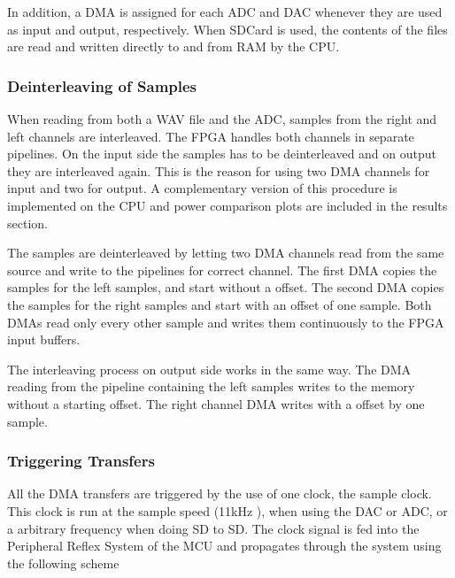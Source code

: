 In addition, a DMA is assigned for each ADC and DAC whenever
they are used as input and output, respectively. When SDCard is
used, the contents of the files are read and written directly to
and from RAM by the CPU.

\subsubsection{Deinterleaving of Samples}

When reading from both a WAV file and the ADC, samples from
the right and left channels are interleaved. The FPGA handles
both channels in separate pipelines. On the input side the
samples has to be deinterleaved and on output they are
interleaved again. This is the reason for using two DMA channels
for input and two for output. A complementary version of this
procedure is implemented on the CPU and power comparison plots
are included in the results section. 


The samples are deinterleaved by letting two DMA channels read
from the same source and write to the pipelines for correct
channel. The first DMA copies the samples for the left samples,
and start without a offset. The second DMA copies the samples
for the right samples and start with an offset of one sample.
Both DMAs read only every other sample and writes them
continuously to the FPGA input buffers.

The interleaving process on output side works in the same way.
The DMA reading from the pipeline containing the left samples
writes to the memory without a starting offset. The right
channel DMA writes with a offset by one sample. 

\subsubsection{Triggering Transfers}

All the DMA transfers are triggered by the use of one clock, the
sample clock. This clock is run at the sample speed (11kHz
), when using the DAC
or ADC, or a arbitrary frequency when doing SD to SD. The clock
signal is fed into the Peripheral Reflex System of the MCU and
propagates through the system using the following scheme

